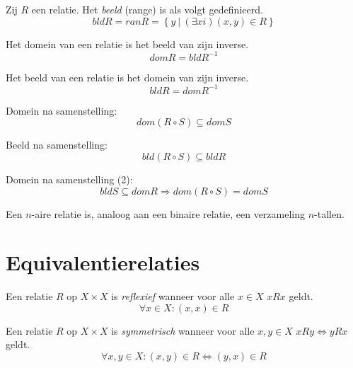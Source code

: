 \documentclass[main.tex]{subfiles}
\begin{document}
\begin{de}
  Zij $R$ een relatie. Het \emph{beeld} (range) is als volgt gedefinieerd.
  \[ bld  R = ran R = \left\{ y \ |\ (\exists xi)(x,y) \in R \right\} \]
\end{de}

\begin{st}
  Het domein van een relatie is het beeld van zijn inverse.
  \[ dom R = bld R^{-1} \]
\end{st}

\begin{st}
  Het beeld van een relatie is het domein van zijn inverse.
  \[ bld R = dom R^{-1} \]
\end{st}

\begin{st}
  Domein na samenstelling:
  \[ dom (R \circ S) \subseteq dom S \]
\end{st}
 
\begin{st}
  Beeld na samenstelling:
  \[ bld (R \circ S) \subseteq bld R \]
\end{st}

\begin{st}
  Domein na samenstelling (2):
  \[ bld S \subseteq dom R \Rightarrow dom(R \circ S) = dom S \]
\end{st}

\begin{de}
  Een $n$-aire relatie is, analoog aan een binaire relatie, een verzameling $n$-tallen.
\end{de}

\section{Equivalentierelaties}
\label{sec:equivalentierelaties}

\begin{de}
  \label{de:reflexief}
  Een relatie $R$ op $X \times X$ is \emph{reflexief} wanneer voor alle $x\in X$ $xRx$ geldt.
  \[ \forall x \in X: (x,x) \in R \]
\end{de}

\begin{de}
  \label{de:symmetrisch}
  Een relatie $R$ op $X \times X$ is \emph{symmetrisch} wanneer voor alle $x,y\in X$ $xRy \Leftrightarrow yRx$ geldt.
  \[ \forall x,y \in X: (x,y) \in R \Leftrightarrow (y,x) \in R\]
\end{de}
\end{document}
